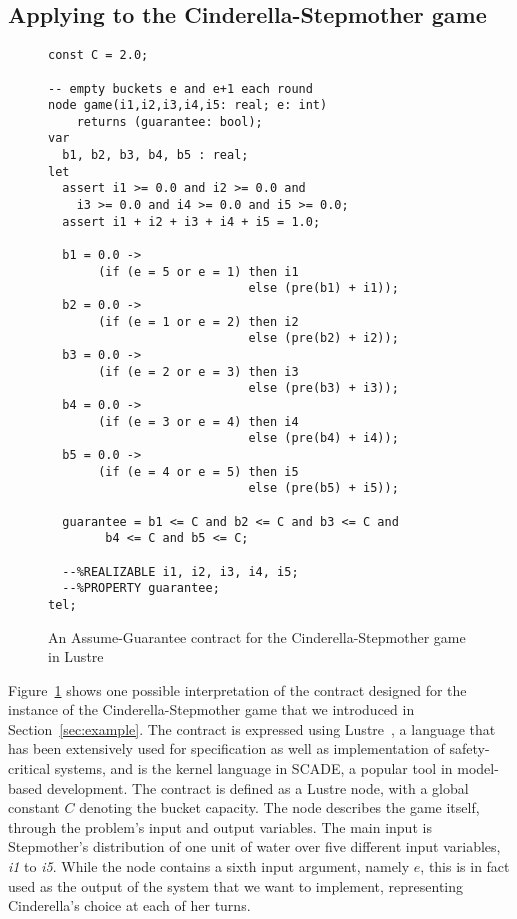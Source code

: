 \subsection{Applying \jsynvg to the Cinderella-Stepmother game}
\label{sec:algexample}

\begin{figure}[!t]
\centering
 \begin{Verbatim}[fontsize=\footnotesize]
const C = 2.0;

-- empty buckets e and e+1 each round
node game(i1,i2,i3,i4,i5: real; e: int)
	returns (guarantee: bool);
var
  b1, b2, b3, b4, b5 : real;
let
  assert i1 >= 0.0 and i2 >= 0.0 and
 	i3 >= 0.0 and i4 >= 0.0 and i5 >= 0.0;
  assert i1 + i2 + i3 + i4 + i5 = 1.0;

  b1 = 0.0 ->
       (if (e = 5 or e = 1) then i1
                            else (pre(b1) + i1));
  b2 = 0.0 ->
       (if (e = 1 or e = 2) then i2
                            else (pre(b2) + i2));
  b3 = 0.0 ->
       (if (e = 2 or e = 3) then i3
                            else (pre(b3) + i3));
  b4 = 0.0 ->
       (if (e = 3 or e = 4) then i4
                            else (pre(b4) + i4));
  b5 = 0.0 ->
       (if (e = 4 or e = 5) then i5
                            else (pre(b5) + i5));

  guarantee = b1 <= C and b2 <= C and b3 <= C and
  	    b4 <= C and b5 <= C;

  --%REALIZABLE i1, i2, i3, i4, i5;
  --%PROPERTY guarantee;
tel;
 \end{Verbatim}
\caption{An Assume-Guarantee contract for the Cinderella-Stepmother game in Lustre}
\label{fg:cind}
\end{figure}

Figure~\ref{fg:cind} shows one possible interpretation of the contract designed
for the instance of the Cinderella-Stepmother game that we introduced in Section~\ref{sec:example}. The contract
is expressed using Lustre~\cite{lustrev6}, a language
that has been extensively used for specification as well as implementation of
safety-critical systems, and is the kernel language in SCADE, a popular tool in
model-based development. The contract is defined as a Lustre node, with a global
constant $C$ denoting the bucket capacity. The node describes the game itself,
through the problem's input and output variables. The main input is Stepmother's
distribution of one unit of water over five different input variables,
\textit{i1} to \textit{i5}. While the node contains a sixth input argument,
namely $e$, this is in fact used as the output of the system that we want to
implement, representing Cinderella's choice at each of her turns.

